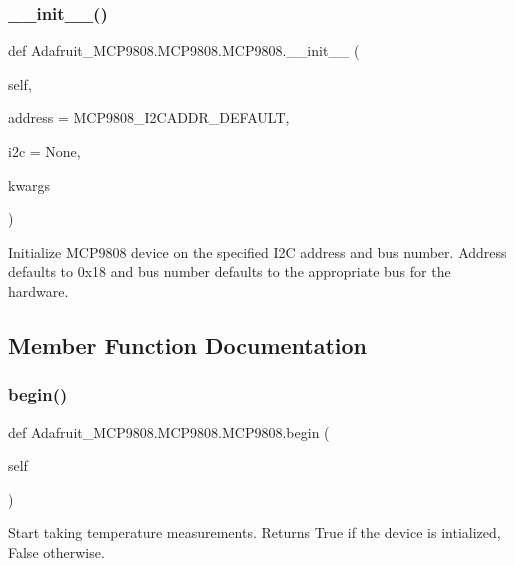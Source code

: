 \subsubsection{\texorpdfstring{\+\_\+\+\_\+init\+\_\+\+\_\+()}{\_\_init\_\_()}}
{\footnotesize\ttfamily def Adafruit\+\_\+\+M\+C\+P9808.\+M\+C\+P9808.\+M\+C\+P9808.\+\_\+\+\_\+init\+\_\+\+\_\+ (\begin{DoxyParamCaption}\item[{}]{self,  }\item[{}]{address = {\ttfamily MCP9808\+\_\+I2CADDR\+\_\+DEFAULT},  }\item[{}]{i2c = {\ttfamily None},  }\item[{}]{kwargs }\end{DoxyParamCaption})}

\begin{DoxyVerb}Initialize MCP9808 device on the specified I2C address and bus number.
Address defaults to 0x18 and bus number defaults to the appropriate bus
for the hardware.
\end{DoxyVerb}
 

\subsection{Member Function Documentation}
\mbox{\label{classAdafruit__MCP9808_1_1MCP9808_1_1MCP9808_ab62a703ef4cf09887846d3eeaa401772}} 
\subsubsection{\texorpdfstring{begin()}{begin()}}
{\footnotesize\ttfamily def Adafruit\+\_\+\+M\+C\+P9808.\+M\+C\+P9808.\+M\+C\+P9808.\+begin (\begin{DoxyParamCaption}\item[{}]{self }\end{DoxyParamCaption})}

\begin{DoxyVerb}Start taking temperature measurements. Returns True if the device is 
intialized, False otherwise.
\end{DoxyVerb}
 \mbox{\label{classAdafruit__MCP9808_1_1MCP9808_1_1MCP9808_a0920c36ee50223d2fda4f6e7caadcada}} 

